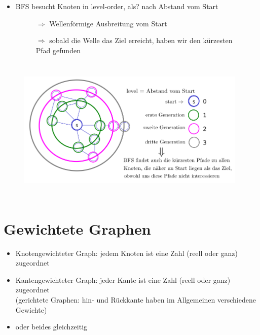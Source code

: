     \begin{itemize}
        \item BFS besucht Knoten in level-order, als? nach Abstand vom Start
    \end{itemize}
    \begin{figure}[htbp]
        \begin{minipage}{5cm}
            \vspace*{0mm}
            \begin{itemize}
            \item[$\Rightarrow$] Wellenförmige Ausbreitung vom Start
            \item[$\Rightarrow$] sobald die Welle das Ziel erreicht, haben wir den kürzesten Pfad gefunden
            \end{itemize}
        \end{minipage}
        \begin{minipage}{10cm}
            \includegraphics[width=11cm,height=7cm,keepaspectratio]{./Pictures/kurWeg.png}
        \end{minipage}
    \end{figure}

    \section{Gewichtete Graphen}
        \begin{itemize}
        \item Knotengewichteter Graph: jedem Knoten ist eine Zahl (reell oder ganz) zugeordnet
        \item Kantengewichteter Graph: jeder Kante ist eine Zahl (reell oder ganz) zugeordnet \\
        (gerichtete Graphen: hin- und Rückkante haben im Allgemeinen verschiedene Gewichte)
        \item oder beides gleichzeitig
        \end{itemize}

